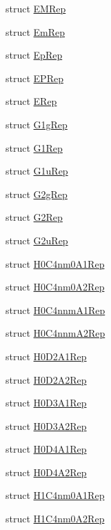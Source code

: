 \begin{DoxyCompactItemize}
\item 
struct \mbox{\hyperlink{structHadron_1_1EMRep}{E\+M\+Rep}}
\item 
struct \mbox{\hyperlink{structHadron_1_1EmRep}{Em\+Rep}}
\item 
struct \mbox{\hyperlink{structHadron_1_1EpRep}{Ep\+Rep}}
\item 
struct \mbox{\hyperlink{structHadron_1_1EPRep}{E\+P\+Rep}}
\item 
struct \mbox{\hyperlink{structHadron_1_1ERep}{E\+Rep}}
\item 
struct \mbox{\hyperlink{structHadron_1_1G1gRep}{G1g\+Rep}}
\item 
struct \mbox{\hyperlink{structHadron_1_1G1Rep}{G1\+Rep}}
\item 
struct \mbox{\hyperlink{structHadron_1_1G1uRep}{G1u\+Rep}}
\item 
struct \mbox{\hyperlink{structHadron_1_1G2gRep}{G2g\+Rep}}
\item 
struct \mbox{\hyperlink{structHadron_1_1G2Rep}{G2\+Rep}}
\item 
struct \mbox{\hyperlink{structHadron_1_1G2uRep}{G2u\+Rep}}
\item 
struct \mbox{\hyperlink{structHadron_1_1H0C4nm0A1Rep}{H0\+C4nm0\+A1\+Rep}}
\item 
struct \mbox{\hyperlink{structHadron_1_1H0C4nm0A2Rep}{H0\+C4nm0\+A2\+Rep}}
\item 
struct \mbox{\hyperlink{structHadron_1_1H0C4nnmA1Rep}{H0\+C4nnm\+A1\+Rep}}
\item 
struct \mbox{\hyperlink{structHadron_1_1H0C4nnmA2Rep}{H0\+C4nnm\+A2\+Rep}}
\item 
struct \mbox{\hyperlink{structHadron_1_1H0D2A1Rep}{H0\+D2\+A1\+Rep}}
\item 
struct \mbox{\hyperlink{structHadron_1_1H0D2A2Rep}{H0\+D2\+A2\+Rep}}
\item 
struct \mbox{\hyperlink{structHadron_1_1H0D3A1Rep}{H0\+D3\+A1\+Rep}}
\item 
struct \mbox{\hyperlink{structHadron_1_1H0D3A2Rep}{H0\+D3\+A2\+Rep}}
\item 
struct \mbox{\hyperlink{structHadron_1_1H0D4A1Rep}{H0\+D4\+A1\+Rep}}
\item 
struct \mbox{\hyperlink{structHadron_1_1H0D4A2Rep}{H0\+D4\+A2\+Rep}}
\item 
struct \mbox{\hyperlink{structHadron_1_1H1C4nm0A1Rep}{H1\+C4nm0\+A1\+Rep}}
\item 
struct \mbox{\hyperlink{structHadron_1_1H1C4nm0A2Rep}{H1\+C4nm0\+A2\+Rep}}
\item 

\end{DoxyCompactItemize}
